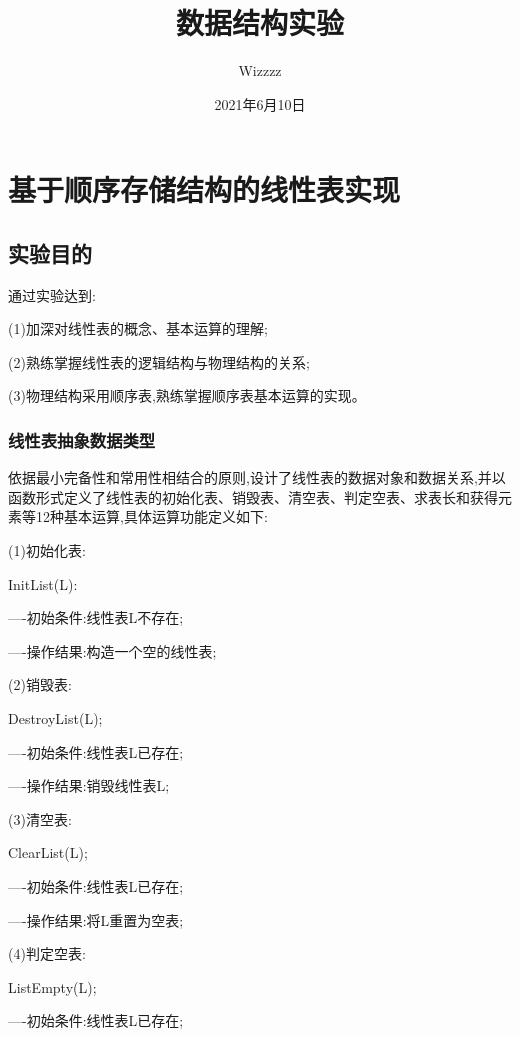 \documentclass[supercite]{Experimental_Report}
\title{~~~~~~数据结构实验~~~~~~}
\author{Wizzzz}
\date{2021年6月10日}
\theoremstyle{definition}
\begin{document}
\maketitle

\clearpage


\tableofcontents[level=3]

\clearpage


\section{基于顺序存储结构的线性表实现}

\subsection{实验目的}

通过实验达到:

(1)加深对线性表的概念、基本运算的理解;

(2)熟练掌握线性表的逻辑结构与物理结构的关系;

(3)物理结构采用顺序表,熟练掌握顺序表基本运算的实现。

\subsubsection{线性表抽象数据类型}

依据最小完备性和常用性相结合的原则,设计了线性表的数据对象和数据关系,并以函数形式定义了线性表的初始化表、销毁表、清空表、判定空表、求表长和获得元素等12种基本运算,具体运算功能定义如下:

(1)初始化表:

InitList(L):

----初始条件:线性表L不存在;

----操作结果:构造一个空的线性表;

(2)销毁表:

DestroyList(L);

----初始条件:线性表L已存在;

----操作结果:销毁线性表L;

(3)清空表:

ClearList(L);

----初始条件:线性表L已存在;

----操作结果:将L重置为空表;

(4)判定空表:

ListEmpty(L);

----初始条件:线性表L已存在;
\end{document}
